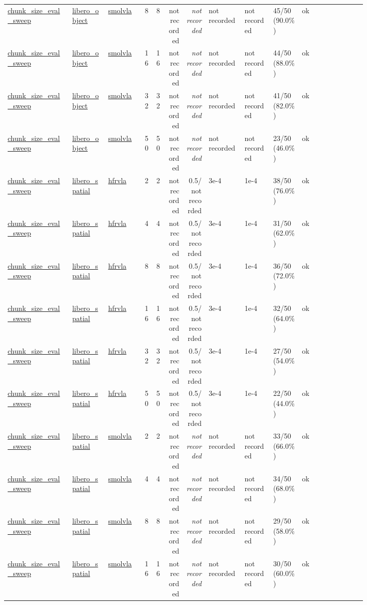 \begin{tiny}
\begin{longtable}{@{}p{0.18\linewidth}p{0.10\linewidth}p{0.10\linewidth}rrrrp{0.10\linewidth}p{0.08\linewidth}p{0.08\linewidth}p{0.11\linewidth}p{0.07\linewidth}@{}}
\url{chunk_size_eval_sweep} & \url{libero_object} & \url{smolvla} & 8 & 8 & not recorded & \emph{not recorded} & not recorded & not recorded & 45/50 (90.0\%) & ok \\
\url{chunk_size_eval_sweep} & \url{libero_object} & \url{smolvla} & 16 & 16 & not recorded & \emph{not recorded} & not recorded & not recorded & 44/50 (88.0\%) & ok \\
\url{chunk_size_eval_sweep} & \url{libero_object} & \url{smolvla} & 32 & 32 & not recorded & \emph{not recorded} & not recorded & not recorded & 41/50 (82.0\%) & ok \\
\url{chunk_size_eval_sweep} & \url{libero_object} & \url{smolvla} & 50 & 50 & not recorded & \emph{not recorded} & not recorded & not recorded & 23/50 (46.0\%) & ok \\
\url{chunk_size_eval_sweep} & \url{libero_spatial} & \url{hfrvla} & 2 & 2 & not recorded & 0.5/not recorded & 3e-4 & 1e-4 & 38/50 (76.0\%) & ok \\
\url{chunk_size_eval_sweep} & \url{libero_spatial} & \url{hfrvla} & 4 & 4 & not recorded & 0.5/not recorded & 3e-4 & 1e-4 & 31/50 (62.0\%) & ok \\
\url{chunk_size_eval_sweep} & \url{libero_spatial} & \url{hfrvla} & 8 & 8 & not recorded & 0.5/not recorded & 3e-4 & 1e-4 & 36/50 (72.0\%) & ok \\
\url{chunk_size_eval_sweep} & \url{libero_spatial} & \url{hfrvla} & 16 & 16 & not recorded & 0.5/not recorded & 3e-4 & 1e-4 & 32/50 (64.0\%) & ok \\
\url{chunk_size_eval_sweep} & \url{libero_spatial} & \url{hfrvla} & 32 & 32 & not recorded & 0.5/not recorded & 3e-4 & 1e-4 & 27/50 (54.0\%) & ok \\
\url{chunk_size_eval_sweep} & \url{libero_spatial} & \url{hfrvla} & 50 & 50 & not recorded & 0.5/not recorded & 3e-4 & 1e-4 & 22/50 (44.0\%) & ok \\
\url{chunk_size_eval_sweep} & \url{libero_spatial} & \url{smolvla} & 2 & 2 & not recorded & \emph{not recorded} & not recorded & not recorded & 33/50 (66.0\%) & ok \\
\url{chunk_size_eval_sweep} & \url{libero_spatial} & \url{smolvla} & 4 & 4 & not recorded & \emph{not recorded} & not recorded & not recorded & 34/50 (68.0\%) & ok \\
\url{chunk_size_eval_sweep} & \url{libero_spatial} & \url{smolvla} & 8 & 8 & not recorded & \emph{not recorded} & not recorded & not recorded & 29/50 (58.0\%) & ok \\
\url{chunk_size_eval_sweep} & \url{libero_spatial} & \url{smolvla} & 16 & 16 & not recorded & \emph{not recorded} & not recorded & not recorded & 30/50 (60.0\%) & ok \\

\end{longtable}
\end{tiny}
